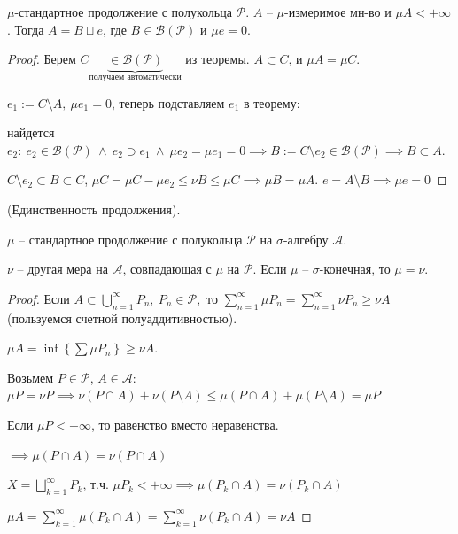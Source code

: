 \begin{consequence}
    $\mu$-стандартное продолжение с полукольца $\mathcal{P}$. $A$ -- $\mu$-измеримое мн-во и $\mu A < +\infty$. Тогда $A = B \sqcup e$, где $B \in \mathcal{B}(\mathcal{P})$ и $\mu e = 0$.
\end{consequence}
\begin{proof}
    Берем $C \underbrace{\in \mathcal{B}(\mathcal{P})}_{\text{получаем автоматически}}$ из теоремы. $A \subset C$, и $\mu A = \mu C$.

    $e_1 := C \setminus A, \ \mu e_1 = 0$, теперь подставляем $e_1$ в теорему: 
    
    найдется $e_2: \ e_2 \in \mathcal{B}(\mathcal{P}) \ \land  \ e_2 \supset e_1 \ \land \ \mu e_2 = \mu e_1 = 0 \implies B := C \setminus e_2 \in \mathcal{B}(\mathcal{P}) \implies B \subset A$.

    $C \setminus e_2 \subset B \subset C$, $\mu C = \mu C - \mu e_2 \leq \nu B \leq \mu C \implies \mu B = \mu A$. $e = A \setminus B \implies \mu e = 0$

\end{proof}

\begin{theorem}
    (Единственность продолжения).
    
    $\mu$ -- стандартное продолжение с полукольца $\mathcal{P}$ на $\sigma$-алгебру $\mathcal{A}$.

    $\nu$ -- другая мера на $\mathcal{A}$, совпадающая с $\mu$ на $\mathcal{P}$. Если $\mu$ -- $\sigma$-конечная, то $\mu = \nu$.
\end{theorem}

\begin{proof}
    Если $A \subset \bigcup_{n=1}^{\infty} P_n, \ P_n \in \mathcal{P},$ то $\sum_{n=1}^{\infty} \mu P_n = \sum_{n=1}^{\infty} \nu P_n \geq \nu A$ (пользуемся счетной полуаддитивностью).

    $\mu A = \inf \left\{ \sum \mu P_n \right\} \geq \nu A$.

    Возьмем $P \in \mathcal{P}$, $A \in \mathcal{A}$: $\mu P = \nu P \implies \nu (P \cap A) + \nu (P \setminus A) \leq \mu (P \cap A) + \mu (P \setminus A) = \mu P$

    Если $\mu P < + \infty$, то равенство вместо неравенства.

    $\implies \mu (P \cap A) = \nu (P \cap A)$

    $X = \bigsqcup_{k=1}^{\infty} P_k$, т.ч. $\mu P_k < +\infty \implies \mu (P_k \cap A) = \nu (P_k \cap A)$

    $\mu A = \sum_{k=1}^{\infty} \mu (P_k \cap A) = \sum_{k=1}^{\infty} \nu (P_k \cap A) = \nu A$
\end{proof}


